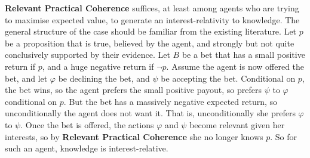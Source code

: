 \documentclass[oneside]{book}
\begin{document}
\textbf{Relevant Practical Coherence} suffices, at least among agents who are trying to maximise expected value, to generate an interest-relativity to knowledge. The general structure of the case should be familiar from the existing literature. Let $p$ be a proposition that is true, believed by the agent, and strongly but not quite conclusively supported by their evidence. Let $B$ be a bet that has a small positive return if $p$, and a huge negative return if $\neg p$. Assume the agent is now offered the bet, and let $\varphi$ be declining the bet, and $\psi$ be accepting the bet. Conditional on $p$, the bet wins, so the agent prefers the small positive payout, so prefers $\psi$ to $\varphi$ conditional on $p$. But the bet has a massively negative expected return, so unconditionally the agent does not want it. That is, unconditionally she prefers $\varphi$ to $\psi$. Once the bet is offered, the actions $\varphi$ and $\psi$ become relevant given her interests, so by \textbf{Relevant Practical Coherence} she no longer knows $p$. So for such an agent, knowledge is interest-relative.
%
%
%
\end{document}
